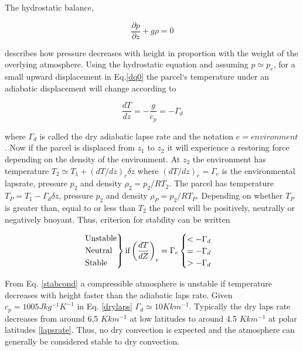 The hydrostatic balance,

\begin{equation}
    \frac{\partial p}{\partial z} +g\rho = 0
\end{equation}

describes how pressure decreases with height in proportion with the weight of the overlying atmosphere. Using the hydrostatic equation and assuming $p \simeq p_{e}$, for a small upward displacement in Eq.\eqref{dq0} the parcel`s temperature under an adiabatic displacement will change according to

\begin{equation}
    \frac{dT}{dz} = -\frac{g}{c_p} = - \Gamma_d
    \label{drylaps}
\end{equation}

where $\Gamma_d$ is called the dry adiabatic lapse rate and the notation $e = environment$. Now if the parcel is displaced from $z_1$ to $z_2$ it will experience a restoring force depending on the density of the environment. At $z_2$ the environment has temperature $T_2 \simeq T_1 + (dT/dz)_e \delta z$ where $(dT/dz)_e = \Gamma_e$ is the environmental lapsrate, pressure $p_2$ and density $\rho_2 = p_2/RT_2$. The parcel has temperature $T_P = T_1 - \Gamma_d\delta z$, pressure $p_2$ and density $\rho_P = p_2/RT_P$. Depending on whether $T_P$ is greater than, equal to or less than $T_2$ the parcel will be positively, neutrally or negatively buoyant. Thus, criterion for stability can be written

\begin{equation}
    \begin{rcases}
      \text{Unstable}\\
      \text{Neutral}\\
      \text{Stable}
    \end{rcases}   
    \text{if} \left(\frac{dT}{dZ}\right)_e = \Gamma_e 
    \begin{cases}
      < - \Gamma_d \\
      = - \Gamma_d \\
      > - \Gamma_d
    \end{cases}
    \label{stabcond}
\end{equation}

From Eq. \eqref{stabcond} a compressible atmosphere is unstable if temperature decreases with height faster than the adiabatic laps rate. Given $c_p = 1005 Jkg^{-1}K^{-1}$ in Eq. \eqref{drylaps} $\Gamma_d \simeq 10 K km^{-1}$. Typically the dry laps rate decreases from around 6,5 $K km^{-1}$ at low latitudes to around 4.5 $K km^{-1}$ at polar latitudes \ref{lapsrate}. Thus, no dry convection is expected and the atmosphere can generally be considered stable to dry convection.     


